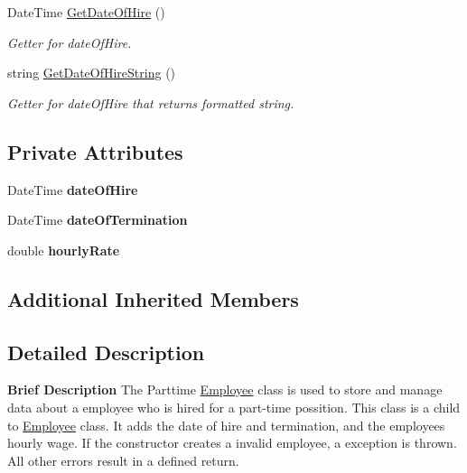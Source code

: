 \begin{DoxyCompactItemize}
Date\+Time \hyperlink{class_all_employees_1_1_parttime_employee_a266fb09cc25fcf9d5e475d8859b1fdac}{Get\+Date\+Of\+Hire} ()
\begin{DoxyCompactList}\small\item\em Getter for date\+Of\+Hire. \end{DoxyCompactList}\item 
string \hyperlink{class_all_employees_1_1_parttime_employee_a18bd3a43e374b89bdd8f6e2ec9f9e51e}{Get\+Date\+Of\+Hire\+String} ()
\begin{DoxyCompactList}\small\item\em Getter for date\+Of\+Hire that returns formatted string. \end{DoxyCompactList}\end{DoxyCompactItemize}
\subsection*{Private Attributes}
\begin{DoxyCompactItemize}
\item 
\hypertarget{class_all_employees_1_1_parttime_employee_ae9217b6e9531dd5f6ac9029982bab405}{}Date\+Time {\bfseries date\+Of\+Hire}\label{class_all_employees_1_1_parttime_employee_ae9217b6e9531dd5f6ac9029982bab405}

\item 
\hypertarget{class_all_employees_1_1_parttime_employee_a98a60c754150cb7ff049b1a6f9eea5bc}{}Date\+Time {\bfseries date\+Of\+Termination}\label{class_all_employees_1_1_parttime_employee_a98a60c754150cb7ff049b1a6f9eea5bc}

\item 
\hypertarget{class_all_employees_1_1_parttime_employee_a43bf804ba70f049a02ce73f2a65ff212}{}double {\bfseries hourly\+Rate}\label{class_all_employees_1_1_parttime_employee_a43bf804ba70f049a02ce73f2a65ff212}

\end{DoxyCompactItemize}
\subsection*{Additional Inherited Members}


\subsection{Detailed Description}
{\bfseries Brief Description} The Parttime \hyperlink{class_all_employees_1_1_employee}{Employee} class is used to store and manage data about a employee who is hired for a part-\/time possition. This class is a child to \hyperlink{class_all_employees_1_1_employee}{Employee} class. It adds the date of hire and termination, and the employees hourly wage. If the constructor creates a invalid employee, a exception is thrown. All other errors result in a defined return. 

